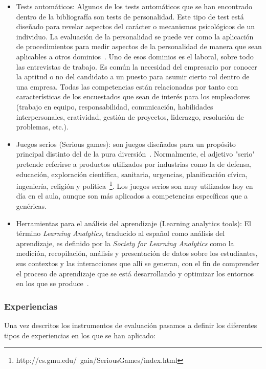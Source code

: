 \begin{itemize}
\item Tests automáticos: Algunos de los tests automáticos que se han encontrado dentro de la bibliografía son tests de personalidad. Este tipo de test está diseñado para revelar aspectos del carácter o mecanismos psicológicos de un individuo. La evaluación de la personalidad se puede ver como la aplicación de procedimientos para medir aspectos de la personalidad de manera que sean aplicables a otros dominios~\cite{wiggins2003paradigms}. Uno de esos dominios es el laboral, sobre todo las entrevistas de trabajo. Es común la necesidad del empresario por conocer la aptitud o no del candidato a un puesto para asumir cierto rol dentro de una empresa. Todas las competencias están relacionadas por tanto con características de los encuestados que sean de interés para los empleadores (trabajo en equipo, responsabilidad, comunicación, habilidades interpersonales, cratividad, gestión de proyectos, liderazgo, resolución de problemas, etc.).
\item Juegos serios (Serious games): son juegos diseñados para un propósito principal distinto del de la pura diversión~\cite{djaouti2011classifying}. Normalmente, el adjetivo "serio" pretende referirse a productos utilizados por industrias como la de defensa, educación, exploración científica, sanitaria, urgencias, planificación cívica, ingeniería, religión y política~\footnote{http://cs.gmu.edu/~gaia/SeriousGames/index.html}. Los juegos serios son muy utilizados hoy en día en el aula, aunque son más aplicados a competencias específicas que a genéricas. 
\item Herramientas para el análisis del aprendizaje (Learning analytics tools): El término \emph{Learning Analytics}, traducido al español como análisis del aprendizaje, es definido por la \emph{Society for Learning Analytics} como la medición, recopilación, análisis y presentación de datos sobre los estudiantes, sus contextos y las interacciones que allí se generan, con el fin de comprender el proceso de aprendizaje que se está desarrollando y optimizar los entornos en los que se produce~\cite{siemens2012learning}.
\end{itemize}

\subsubsection{Experiencias}

Una vez descritos los instrumentos de evaluación pasamos a definir los diferentes tipos de experiencias en los que se han aplicado:


